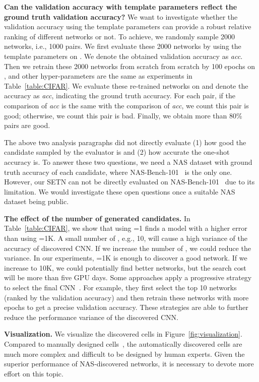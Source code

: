 \documentclass[10pt,twocolumn,letterpaper]{article}
\def\Figref#1{Figure~\ref{#1}}
\def\Tabref#1{Table~\ref{#1}}
\def\NAME{{SETN}}
\begin{document}
\textbf{Can the validation accuracy with template parameters reflect the ground truth validation accuracy?}
We want to investigate whether the validation accuracy using the template parameters can provide a robust relative ranking of different networks or not.
To achieve, we randomly sample 2000 networks, i.e., 1000 pairs.
We first evaluate these 2000 networks by using the template parameters on .
We denote the obtained validation accuracy as \textit{acc}.
Then we retrain these 2000 networks from scratch from scratch by 100 epochs on , and other hyper-parameters are the same as experiments in \Tabref{table:CIFAR}.
We evaluate these re-trained networks on  and denote the accuracy as \textit{acc}, indicating the ground truth accuracy.
For each pair, if the comparison of \textit{acc} is the same with the comparison of \textit{acc}, we count this pair is good; otherwise, we count this pair is bad.
Finally, we obtain more than 80\% pairs are good.


The above two analysis paragraphs did not directly evaluate (1) how good the candidate sampled by the evaluator is and (2) how accurate the one-shot accuracy is.
To answer these two questions, we need a NAS dataset with ground truth accuracy of each candidate, where NAS-Bench-101~\cite{ying2019bench} is the only one.
However, our {\NAME} can not be directly evaluated on NAS-Bench-101~\cite{ying2019bench} due to its limitation.
We would investigate these open questions once a suitable NAS dataset being public.


\textbf{The effect of the number of generated candidates.}
In \Tabref{table:CIFAR}, we show that using =1 finds a model with a higher error than using =1K.
A small number of , e.g., 10, will cause a high variance of the accuracy of discovered CNN.
If we increase the number of , we could reduce the variance. In our experiments, =1K is enough to discover a good network.
If we increase  to 10K, we could potentially find better networks, but the search cost will be more than five GPU days.
Some approaches apply a progressive strategy to select the final CNN~\cite{bender2018understanding,zhang2019graph}.
For example, they first select the top 10 networks (ranked by the validation accuracy) and then retrain these networks with more epochs to get a precise validation accuracy.
These strategies are able to further reduce the performance variance of the discovered CNN.






\textbf{Visualization.}
We visualize the discovered cells in \Figref{fig:visualization}.
Compared to manually designed cells~\cite{he2016deep,szegedy2016rethinking,xie2017aggregated}, the automatically discovered cells are much more complex and difficult to be designed by human experts.
Given the superior performance of NAS-discovered networks, it is necessary to devote more effort on this topic.
\end{document}
